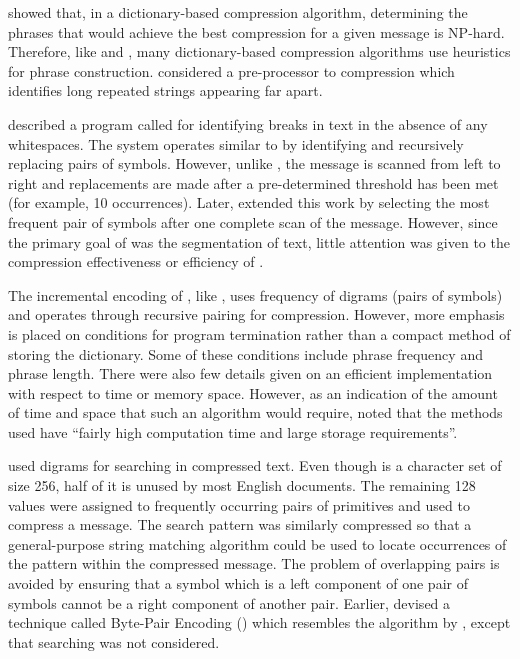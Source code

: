 \citet{ss82:jacm} showed that, in a dictionary-based 
compression algorithm,
determining the phrases that would achieve the best compression for
a given message is NP-hard.  Therefore, like \lza and \lzb, many 
dictionary-based compression algorithms use heuristics for phrase
construction.  \citet{bm01:is} considered a 
pre-processor to compression which identifies long repeated 
strings appearing far apart.

\citet{wolff75:bjp} described a program called \mka 
for identifying
breaks in text in the absence of any whitespaces.  The
system operates similar to \repair by identifying
and recursively replacing pairs of symbols.  However, unlike
\repair, the message is scanned from left to right and
replacements are made after a pre-determined threshold has
been met (for example, 10 occurrences).  Later, \citet{wolff77:bjp}
extended this work by selecting the most frequent pair of
symbols after one complete scan of the message.  However,
since the primary goal of \citeauthor{wolff75:bjp} was the
segmentation of text, little attention was given to the compression
effectiveness or efficiency of \mka.

The incremental encoding of \citet{rubin76:cacm}, like \repair,
uses frequency of digrams (pairs of symbols) and operates
through recursive pairing for compression.  However, more 
emphasis is placed on conditions for program termination 
rather than a compact method of storing the dictionary.  Some
of these conditions include phrase frequency and phrase length.
There were also few details given on an efficient 
implementation with respect to time or memory space.
However, as an indication of the amount of time and space 
that such an algorithm would require, 
\citet{rubin76:cacm} noted that the methods
used have ``fairly high computation time and large storage 
requirements''.

\citet{manber97:tis} used digrams for searching in compressed
text.  Even though \eascii is a character set of size 256, half
of it is unused by most English documents.  The remaining 128
values were assigned to frequently occurring pairs of primitives
and used to compress a message.  The search pattern was similarly
compressed so that a general-purpose string matching algorithm
could be used to locate occurrences of the pattern within the
compressed message.  The problem of overlapping pairs is avoided
by ensuring that a symbol which is a left component of one pair of
symbols cannot be a right component of another pair.  Earlier,
\citet{gage94:cusers} devised a technique called Byte-Pair
Encoding (\bpe) which resembles the algorithm
by \citeauthor{manber97:tis}, except that searching was not 
considered.

